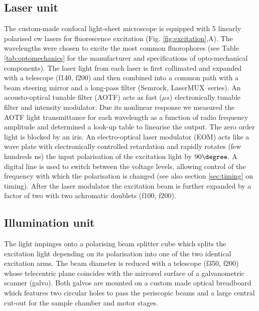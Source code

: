 \documentclass[12pt]{spieman}  %
\begin{document}
\subsection{Laser unit}		
The custom-made confocal light-sheet microscope is equipped with 5 linearly polarised cw lasers for fluorescence excitation (Fig. \ref{fig:excitation},A). The wavelengths were chosen to excite the most common fluorophores (see Table \ref{tab:optomechanics} for the manufacturer and specifications of opto-mechanical components). The laser light from each laser is first collimated and expanded with a telescope (f140, f200) and then combined into a common path with a beam steering mirror and a long-pass filter (Semrock, LaserMUX\texttrademark\ series). An acousto-optical tunable filter (AOTF) acts as fast ($\mu s$) electronically tunable filter and intensity modulator. %
Due its nonlinear response we measured the AOTF light transmittance for each wavelength as a function of radio frequency amplitude and determined a look-up table to linearise the output. The zero order light is blocked by an iris. An electro-optical laser modulator (EOM) acts like a wave plate with electronically controlled retardation and rapidly rotates (few hundreds ns) the input polarisation of the excitation light by $90\degree$. %
A digital line is used to switch between the voltage levels, allowing control of the frequency with which the polarisation is changed (see also section \ref{sec:timing} on timing). After the laser modulator the excitation beam is further expanded by a factor of two with two achromatic doublets (f100, f200). 

\subsection{Illumination unit}		
The light impinges onto a polarising beam splitter cube which splits the excitation light depending on its polarisation into one of the two identical excitation arms. The beam diameter is reduced with a telescope (f350, f200) whose telecentric plane coincides with the mirrored surface of a galvanometric scanner (galvo). Both galvos are mounted on a custom made optical breadboard which features two circular holes to pass the periscopic beams and a large central cut-out for the sample chamber and motor stages. 
\end{document}
